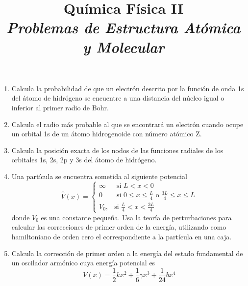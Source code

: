 \documentclass[a4paper, 11pt]{article}
\title{\huge\textsf{\textbf{Qu\'imica Física II}\\
\Large \textit{Problemas de Estructura Atómica y Molecular}}}
\date{}
\begin{document}
\maketitle
\large
\begin{enumerate}
    \item Calcula la probabilidad de que un electrón descrito por la
    función de onda 1s del átomo de hidrógeno se encuentre a una distancia del 
    núcleo igual o inferior al primer radio de Bohr.
    
    \item Calcula el radio más probable al que se encontrará un
    electrón cuando ocupe un orbital 1s de un átomo 
    hidrogenoide con número atómico Z.
    
    \item Calcula la posición exacta de los nodos de las funciones
    radiales de los orbitales 1s, 2s, 2p y 3s del átomo de hidrógeno.
    
    \item Una partícula se encuentra sometida al siguiente potencial
    \begin{equation*}
\hat{V}(x)=
\begin{cases}
  \infty & \text{ si } L<x<0\\
  0  & \text{ si } 0\leq x\leq \frac{L}{4}\text{  o  }\frac{3L}{4}\leq x\leq L
\\
  V_0, & \text{si } \frac{L}{4}<x<\frac{3L}{4}
\end{cases}
\end{equation*}
    donde $V_0$ es una constante pequeña. Usa la teoría de perturbaciones
    para calcular las correcciones de primer orden de la energía, utilizando
    como hamiltoniano de orden cero el correspondiente a la partícula en 
    una caja.
    
    \item Calcula la corrección de primer orden a la energía del 
    estado fundamental de un oscilador armónico cuya energía potencial 
    es 
    \begin{equation*}
        V(x)=\frac{1}{2}kx^2 + \frac{1}{6}\gamma x^3  + \frac{1}{24}bx^4
    \end{equation*}
\end{enumerate}
\end{document}
